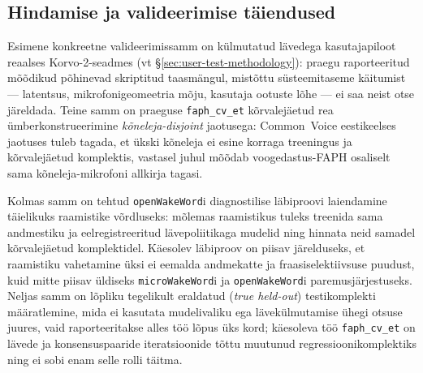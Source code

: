 \subsection{Hindamise ja valideerimise täiendused}
\label{sec:future-validation}

Esimene konkreetne valideerimissamm on külmutatud lävedega kasutajapiloot reaalses Korvo-2-seadmes (vt §\ref{sec:user-test-methodology}): praegu raporteeritud mõõdikud põhinevad skriptitud taasmängul, mistõttu süsteemitaseme käitumist --- latentsus, mikrofonigeomeetria mõju, kasutaja ootuste lõhe --- ei saa neist otse järeldada. Teine samm on praeguse \texttt{faph\_cv\_et} kõrvalejäetud rea ümberkonstrueerimine \emph{kõneleja-disjoint} jaotusega: Common~Voice eestikeelses jaotuses tuleb tagada, et ükski kõneleja ei esine korraga treeningus ja kõrvalejäetud komplektis, vastasel juhul mõõdab voogedastus-FAPH osaliselt sama kõneleja-mikrofoni allkirja tagasi.

Kolmas samm on tehtud \texttt{openWakeWord}i diagnostilise läbiproovi laiendamine täielikuks raamistike võrdluseks: mõlemas raamistikus tuleks treenida sama andmestiku ja eelregistreeritud lävepoliitikaga mudelid ning hinnata neid samadel kõrvalejäetud komplektidel. Käesolev läbiproov on piisav järelduseks, et raamistiku vahetamine üksi ei eemalda andmekatte ja fraasiselektiivsuse puudust, kuid mitte piisav üldiseks \texttt{microWakeWord}i ja \texttt{openWakeWord}i paremusjärjestuseks. Neljas samm on lõpliku tegelikult eraldatud (\emph{true held-out}) testikomplekti määratlemine, mida ei kasutata mudelivaliku ega lävekülmutamise ühegi otsuse juures, vaid raporteeritakse alles töö lõpus üks kord; käesoleva töö \texttt{faph\_cv\_et} on lävede ja konsensuspaaride iteratsioonide tõttu muutunud regressioonikomplektiks ning ei sobi enam selle rolli täitma.
